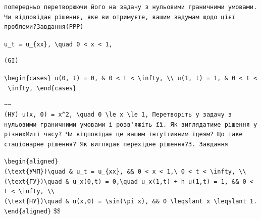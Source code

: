 \documentclass[
  ukrainian,
]{article}
\begin{document}
\begin{verbatim}
попередньо перетворюючи його на задачу з нульовими граничними умовами. Чи відповідає рішення, яке ви отримуєте, вашим задумам щодо цієї проблеми?Завдання(PPP)
\end{verbatim}

\texttt{u\_t\ =\ u\_\{xx\},\ \textbackslash{}quad\ 0\ \textless{}\ x\ \textless{}\ 1,}

\begin{verbatim}
(GI)
\end{verbatim}

\texttt{\textbackslash{}begin\{cases\}\ u(0,\ t)\ =\ 0,\ \&\ 0\ \textless{}\ t\ \textless{}\ \textbackslash{}infty,\ \textbackslash{}\textbackslash{}\ u(1,\ t)\ =\ 1,\ \&\ 0\ \textless{}\ t\ \textless{}\ \textbackslash{}infty,\ \textbackslash{}end\{cases\}}

\begin{verbatim}
~~
(НУ) u(x, 0) = x^2, \quad 0 \le x \le 1, Перетворіть у задачу з нульовими граничними умовами і розв'яжіть її. Як виглядатиме рішення у різнихМиті часу? Чи відповідає це вашим інтуїтивним ідеям? Що таке стаціонарне рішення? Як виглядає перехідне рішення?3. Завдання
\end{verbatim}

\texttt{\textbackslash{}begin\{aligned\}}
\texttt{(\textbackslash{}text\{УЧП\})\textbackslash{}quad\ \&\ u\_t\ =\ u\_\{xx\},\ \&\&\ 0\ \textless{}\ x\ \textless{}\ 1,\textbackslash{}\ 0\ \textless{}\ t\ \textless{}\ \textbackslash{}infty,\ \textbackslash{}\textbackslash{}}
\texttt{(\textbackslash{}text\{ГУ\})\textbackslash{}quad\ \&\ u\_x(0,t)\ =\ 0,\textbackslash{}quad\ u\_x(1,t)\ +\ h\ u(1,t)\ =\ 1,\ \&\&\ 0\ \textless{}\ t\ \textless{}\ \textbackslash{}infty,\ \textbackslash{}\textbackslash{}}
\texttt{(\textbackslash{}text\{НУ\})\textbackslash{}quad\ \&\ u(x,0)\ =\ \textbackslash{}sin(\textbackslash{}pi\ x),\ \&\&\ 0\ \textbackslash{}leqslant\ x\ \textbackslash{}leqslant\ 1.}
\texttt{\textbackslash{}end\{aligned\}} \$\$
\end{document}
